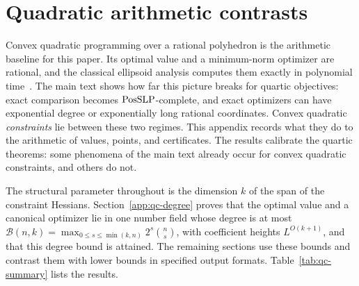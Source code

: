 \section{Quadratic arithmetic contrasts}
\label{app:qc}

Convex quadratic programming over a rational polyhedron is the arithmetic
baseline for this paper. Its optimal value and a minimum-norm optimizer are
rational, and the classical ellipsoid analysis computes them exactly in
polynomial time~\cite{KozlovTarasovKhachiyan1980}. The main text shows how far
this picture breaks for quartic objectives: exact comparison becomes
$\mathrm{PosSLP}$-complete, and exact optimizers can have exponential degree or
exponentially long rational coordinates. Convex quadratic \emph{constraints}
lie between these two regimes. This appendix records what they do to the
arithmetic of values, points, and certificates. The results calibrate the
quartic theorems: some phenomena of the main text already occur for convex
quadratic constraints, and others do not.

The structural parameter throughout is the dimension $k$ of the span of the
constraint Hessians. Section~\ref{app:qc-degree} proves that the optimal value
and a canonical optimizer lie in one number field whose degree is at most
$\mathcal B(n,k)=\max_{0\le s\le\min(k,n)}2^s\binom ns$, with coefficient
heights $L^{O(k+1)}$, and that this degree bound is attained. The remaining
sections use these bounds and contrast them with lower bounds in specified
output formats. Table~\ref{tab:qc-summary} lists the results.

